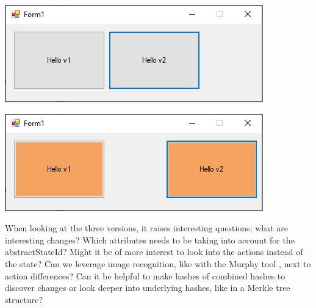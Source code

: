 \begingroup
\captionsetup{type=figure}
\includegraphics[scale=1]{pics/exp-v2.png}
\label{fig:exp-v2}
\endgroup

\begingroup
\captionsetup{type=figure}
\includegraphics[scale=1]{pics/exp-v3.png}
\label{fig:exp-v3}
\endgroup

When looking at the three versions, it raises interesting questions; what are interesting changes? Which attributes needs to be taking into account for the abstractStateId? Might it be of more interest to look into the actions instead of the state? Can we leverage image recognition, like with the Murphy tool \cite{murphy-extract-gui}, next to action differences? Can it be helpful to make hashes of combined hashes to discover changes or look deeper into underlying hashes, like in a Merkle tree \cite{merkle-tree} structure?